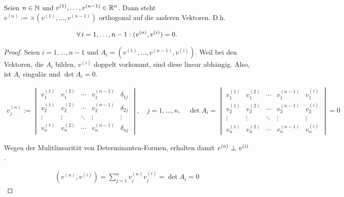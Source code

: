 \begin{theorem*}

Seien $n \in \mathbb{N}$ und $v^{(1)}, \ldots, v^{(n-1)} \in \mathbb{R}^n$.
Dann steht $v^{(n)} := \times(v^{(1)}, \ldots, v^{(n-1)})$ orthogonal auf die anderen Vektoren.
D.h.

\begin{align*}
  \forall \, i = 1, \ldots, n-1:
  (v^{(n)}, v^{(i)}) = 0.
\end{align*}

\end{theorem*}

\begin{proof}

Seien $i = 1, \ldots, n-1$ und $A_i = (v^{(1)}, \ldots, v^{(n-1)}, v^{(i)})$.
Weil bei den Vektoren, die $A_i$ bilden, $v^{(i)}$ doppelt vorkommt, sind diese linear abhängig.
Also, ist $A_i$ singulär und $\det{A_i} = 0$.

\begin{align*}
  v^{(n)}_j
  :=
  \begin{vmatrix}
    v^{(1)}_1 & v^{(2)}_1 & \cdots & v^{(n-1)}_1 & \delta_{1 j} \\
    v^{(1)}_2 & v^{(2)}_2 & \cdots & v^{(n-1)}_2 & \delta_{2 j} \\
    \vdots    & \vdots    & \ddots & \vdots      & \vdots \\
    v^{(1)}_n & v^{(2)}_n & \cdots & v^{(n-1)}_n & \delta_{n j}
  \end{vmatrix},
  \quad
  j = 1, \ldots, n,
  \quad
  \det{A_i}
  =
  \begin{vmatrix}
    v^{(1)}_1 & v^{(2)}_1 & \cdots & v^{(n-1)}_1 & v^{(i)}_1 \\
    v^{(1)}_2 & v^{(2)}_2 & \cdots & v^{(n-1)}_2 & v^{(i)}_2 \\
    \vdots    & \vdots    & \ddots & \vdots      & \vdots \\
    v^{(1)}_n & v^{(2)}_n & \cdots & v^{(n-1)}_n & v^{(i)}_n
  \end{vmatrix}
  = 0
\end{align*}

Wegen der Mulitlinearität von Determinanten-Formen, erhalten damit $v^{(n)} ~\bot_{}~ v^{(i)}$.

\begin{align*}
  (v^{(n)}, v^{(i)})
  =
  \sum_{j=1}^n
  v^{(n)}_j
  v^{(i)}_j
  =
  \det{A_i} = 0
\end{align*}

\end{proof}
